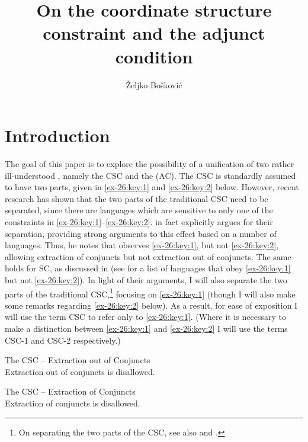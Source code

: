 \documentclass[output=paper]{langsci/langscibook}
\author{Željko Bošković\affiliation{University of Connecticut}}
\title{On the coordinate structure constraint and the adjunct condition}
\begin{document}
\glsresetall


\section{Introduction}

The goal of this paper is to explore the possibility of a unification of two
rather ill-understood , namely the \gls{CSC} and the  (AC). The \gls{CSC} is standardly assumed to have two parts, given in \eqref{ex-26:key:1} and
\eqref{ex-26:key:2} below.  However, recent research has shown that the two parts of the
traditional \gls{CSC} need to be separated,
since there are languages which are sensitive to only one of the constraints in
\eqref{ex-26:key:1}--\eqref{ex-26:key:2}. \textcite{Odainpress} in fact explicitly argues for their separation,
providing strong arguments to this effect based on a number of languages. Thus,
he notes that  observes \eqref{ex-26:key:1}, but not \eqref{ex-26:key:2}, allowing extraction of
conjuncts but not extraction out of conjuncts. The same holds for \gls{SC}, as
discussed in \textcite{Stjepanovic2014} (see \citealt{Odainpress} for a list of
languages that obey \eqref{ex-26:key:1} but not \eqref{ex-26:key:2}). In light of their arguments, I will also
separate the two parts of the traditional \gls{CSC},\footnote{On separating the two parts of the
\gls{CSC}, see also \citet{Grosu1973} and
\citet{Postal1998}.} focusing on \eqref{ex-26:key:1} (though I will also make some remarks
regarding \eqref{ex-26:key:2} below).  As a result, for ease of exposition I will use the term
\gls{CSC} to refer only to \eqref{ex-26:key:1}. (Where it
is necessary to make a distinction between \eqref{ex-26:key:1} and \eqref{ex-26:key:2} I will use the terms
CSC-1 and CSC-2 respectively.)

\ea\label{ex-26:key:1}The \glsdesc{CSC} -- Extraction out of Conjuncts\\
	Extraction out of conjuncts is disallowed.
\z

\ea\label{ex-26:key:2}The \glsdesc{CSC} – Extraction of Conjuncts\\
	Extraction of conjuncts is disallowed.
\z
\end{document}
